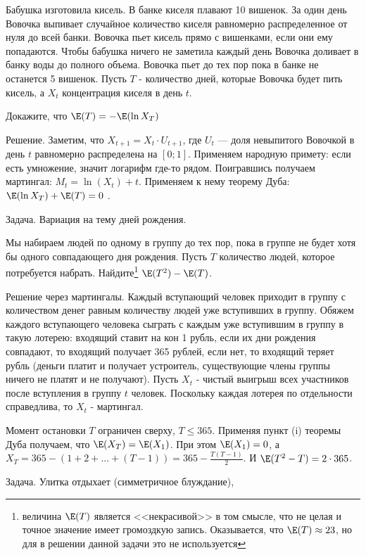 {Бабушка изготовила кисель. В банке киселя плавают 10 вишенок. За один день Вовочка выпивает случайное количество киселя равномерно распределенное от нуля до всей банки. Вовочка пьет кисель прямо с вишенками, если они ему попадаются. Чтобы бабушка ничего не заметила каждый день Вовочка доливает в банку воды до полного объема.
Вовочка пьет до тех пор пока в банке не останется 5 вишенок. Пусть $T$ - количество дней, которые Вовочка будет пить кисель, а $X_{t}$ концентрация киселя в день $t$.

Докажите, что $\E(T)=-\E(\ln X_{T})$ 

Решение. Заметим, что $ X_{t+1}=X_{t}\cdot U_{t+1} $, где $ U_{t} $ --- доля невыпитого Вовочкой в день $ t $ равномерно распределена на $ [0;1] $. Применяем народную примету: если есть умножение, значит логарифм где-то рядом. Поигравшись получаем мартингал: $ M_{t}=\ln(X_{t})+t$. Применяем к нему теорему Дуба: $\E(\ln X_{T})+\E(T)=0$ .




Задача. Вариация на тему дней рождения.

Мы набираем людей по одному в группу до тех пор, пока в группе не будет хотя бы одного совпадающего дня рождения. Пусть $T$ количество людей, которое потребуется набрать. Найдите\footnote{величина $\E(T)$ является <<некрасивой>> в том смысле, что не целая и точное значение имеет громоздкую запись. Оказывается, что $\E(T)\approx 23$, но для в решении данной задачи это не используется} $\E(T^{2})-\E(T)$. 

Решение через мартингалы. Каждый вступающий человек приходит в группу с количеством денег равным количеству людей уже вступивших в группу. Обяжем каждого вступающего человека сыграть с каждым уже вступившим в группу в такую лотерею: входящий ставит на кон 1 рубль, если их дни рождения совпадают, то входящий получает 365 рублей, если нет, то входящий теряет рубль (деньги платит и получает устроитель, существующие члены группы ничего не платят и не получают). Пусть $X_{t}$ - чистый выигрыш всех участников после вступления в группу $t$ человек. Поскольку каждая лотерея по отдельности справедлива, то $X_{t}$ - мартингал. 

Момент остановки $T$ ограничен сверху, $T\leq 365$. Применяя пункт (i) теоремы Дуба получаем, что $\E(X_{T})=\E(X_{1})$. При этом $\E(X_{1})=0$, а $X_{T}=365-(1+2+...+(T-1))=365-\frac{T(T-1)}{2}$. И $\E(T^{2}-T)=2\cdot 365$.

Задача. Улитка отдыхает (симметричное блуждание), \cite{blom:pspt}

}
